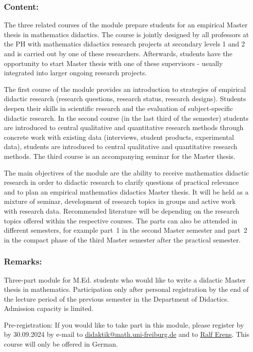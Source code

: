 \documentclass[a4paper,10pt]{article}
\begin{document}
\subsubsection*{\large
    Content:
}
The three related courses of the module prepare students for an empirical Master thesis in mathematics didactics. The course is jointly designed by all professors at the PH with mathematics didactics research projects at secondary levels 1 and 2 and is carried out by one of these researchers. Afterwards, students have the opportunity to start Master thesis with one of these supervisors - usually integrated into larger ongoing research projects.

The first course of the module provides an introduction to strategies of empirical didactic research (research questions, research status, research designs). Students deepen their skills in scientific research and the evaluation of subject-specific didactic research. In the second course (in the last third of the semester) students are introduced to central qualitative and quantitative research methods through concrete work with existing data (interviews, student products, experimental data), students are introduced to central qualitative and quantitative research methods. The third course is an accompanying seminar for the Master thesis.

The main objectives of the module are the ability to receive mathematics didactic research in order to didactic research to clarify questions of practical relevance and to plan an empirical mathematics didactics Master thesis.
It will be held as a mixture of seminar, development of research topics in groups and active work with research data. Recommended literature will be depending on the research topics offered within the respective courses. The parts can also be attended in different semesters, for example part~1 in the second Master semester and part~2 in the compact phase of the third Master semester after the practical semester.

\subsubsection*{\large
    Remarks:
}
Three-part module for M.Ed. students who would like to write a didactic Master thesis in mathematics. Participation only after personal registration by the end of the lecture period of the previous semester in the Department of Didactics. Admission capacity is limited. \par
Pre-registration: If you would like to take part in this module, please register by by 30.09.2024 by e-mail to
\href{mailto:didaktik@math.uni-freiburg.de}{didaktik@math.uni-freiburg.de} and to \href{mailto:erens@ph-freiburg.de}{Ralf Erens}.
This course will only be offered in German.
\cleardoublepage
\end{document}
